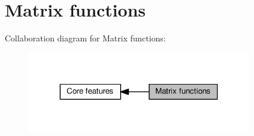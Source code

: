 \hypertarget{group__core__func__matrix}{}\section{Matrix functions}
\label{group__core__func__matrix}
Collaboration diagram for Matrix functions\+:
\nopagebreak
\begin{figure}[H]
\begin{center}
\leavevmode
\includegraphics[width=278pt]{d7/d12/group__core__func__matrix}
\end{center}
\end{figure}
